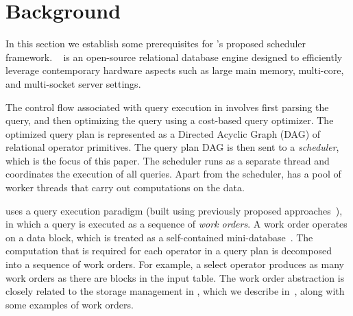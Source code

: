 \section{Background}\label{sec:background}
In this section we establish some prerequisites for \sys{}'s proposed scheduler framework.
\sys{}~\cite{quickstep} is an open-source relational database engine 
designed to efficiently leverage contemporary hardware aspects such as large main memory, multi-core, and multi-socket server settings. 

The control flow associated with query execution in \sys{} involves first parsing the query, and then optimizing the query using a cost-based query optimizer.
The optimized query plan is represented as a Directed Acyclic Graph (DAG) of relational operator primitives. 
The query plan DAG is then sent to a \textit{scheduler}, which is the focus of this paper. 
The scheduler runs as a separate thread and coordinates the execution of all queries. 
Apart from the scheduler, \sys{} has a pool of worker threads that carry out computations on the data. 

\sys{} uses a query execution paradigm (built using previously proposed approaches~\cite{qsstorage,morsel}), in which a query is executed as a sequence of \textit{work orders}. 
A work order operates on a data block, which is treated as a self-contained mini-database~\cite{qsstorage}. 
The computation that is required for each operator in a query plan is decomposed into a sequence of work orders. 
For example, a select operator produces as many work orders as there are blocks in the input table. 
The work order abstraction is closely related to the storage management in \sys{}, which we describe in~\cite{supplement}, along with some examples of work orders.